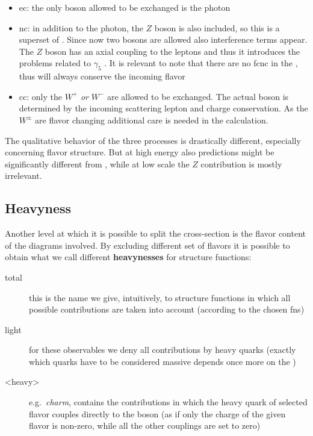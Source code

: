 \begin{itemize}
  \item \acrfull{ec}: the only boson allowed to be exchanged is the photon
  \item \acrfull{nc}: in addition to the photon, the $Z$ boson is also
    included, so this is a superset of \ec.
    Since now two bosons are allowed also interference terms appear.
    The $Z$ boson has an axial coupling to the leptons and thus it introduces
    the problems related to $\gamma_5$ \cite{Gnendiger:2017pys}.
    It is relevant to note that there are no \acrfull{fcnc} in the \sm, thus
    \nc will always conserve the incoming flavor
  \item \acrfull{cc}: only the $W^+$ \textit{or} $W^-$ are allowed to be
    exchanged.
    The actual boson is determined by the incoming scattering lepton and charge
    conservation. As the $W^\pm$ are flavor changing additional care is needed
    in the calculation.
\end{itemize}

The qualitative behavior of the three processes is drastically different,
especially \cc concerning flavor structure.
But at high energy also \nc predictions might be significantly different from
\ec, while at low scale the $Z$ contribution is mostly irrelevant.

\subsection{Heavyness}

Another level at which it is possible to split the \dis cross-section is the
flavor content of the diagrams involved.
By excluding different set of flavors it is possible to obtain what we call
different \textbf{heavynesses} for structure functions:
\begin{description}
  \item[total] this is the name we give, intuitively, to structure functions in
    which all possible contributions are taken into account (according to the
    chosen \acrlong{fns})
  \item[light] for these observables we deny all contributions by heavy quarks
    (exactly which quarks have to be considered massive depends once more on
    the \fns)
  \item[<heavy>] e.g.\ \textit{charm}, contains the contributions in which the
    heavy quark of selected flavor couples directly to the \ew boson (as if
    only the charge of the given flavor is non-zero, while all the other
    couplings are set to zero)
\end{description}

